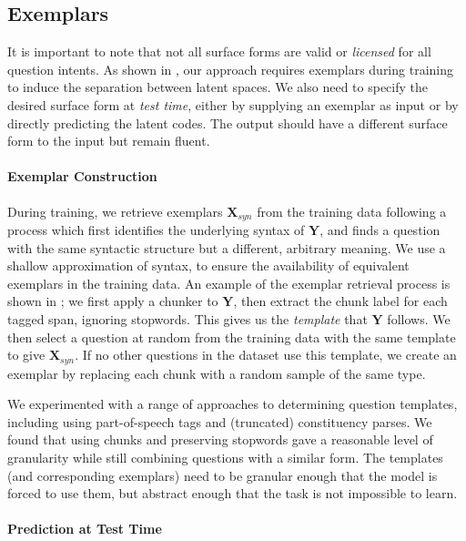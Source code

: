 \documentclass[11pt,a4paper]{article}
\begin{document}
\subsection{Exemplars}
\label{sec:exemplars}

It is important to note that not all surface forms are valid or
\textit{licensed} for all question intents. As shown in
, our approach requires exemplars during training
to induce the separation between latent spaces.  We also need to
specify the desired surface form at \textit{test time}, either by
supplying an exemplar as input or by directly predicting the latent
codes. The output should have a different surface form to the input
but remain fluent.

\paragraph{Exemplar Construction}

During training, we retrieve exemplars $\textbf{X}_{syn}$ from the
training data following a process which first identifies the
underlying syntax of $\textbf{Y}$, and finds a question with the same
syntactic structure but a different, arbitrary meaning. We use a
shallow approximation of syntax, to ensure the availability of
equivalent exemplars in the training data. An example of the exemplar
retrieval process is shown in ; we first
apply a chunker \citep[FlairNLP, ][]{akbik-etal-2018-contextual} to
$\textbf{Y}$, then extract the chunk label for each tagged span,
ignoring stopwords. This gives us the \textit{template} that
$\textbf{Y}$ follows. We then select a question at random from the
training data with the same template to give $\textbf{X}_{syn}$. If no
other questions in the dataset use this template, we create an exemplar by replacing each chunk with a random sample of the same type.



We experimented with a range of approaches to determining question
templates, including using part-of-speech tags and (truncated)
constituency parses. We found that using chunks and preserving
stopwords gave a reasonable level of granularity while still combining
questions with a similar form. The templates (and corresponding
exemplars) need to be granular enough that the model is forced to use
them, but abstract enough that the task is not impossible to learn.

\paragraph{Prediction at Test Time}
\label{sec:mlp}
\end{document}
